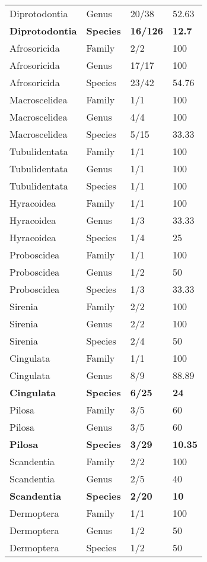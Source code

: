 \begin{longtable}{llll}
  Diprotodontia & Genus & 20/38 & 52.63 \\ 
  \textbf{Diprotodontia} & \textbf{Species} & \textbf{16/126} & \textbf{12.7} \\ 
  Afrosoricida & Family & 2/2 & 100 \\ 
  Afrosoricida & Genus & 17/17 & 100 \\ 
  Afrosoricida & Species & 23/42 & 54.76 \\ 
  Macroscelidea & Family & 1/1 & 100 \\ 
  Macroscelidea & Genus & 4/4 & 100 \\ 
  Macroscelidea & Species & 5/15 & 33.33 \\ 
  Tubulidentata & Family & 1/1 & 100 \\ 
  Tubulidentata & Genus & 1/1 & 100 \\ 
  Tubulidentata & Species & 1/1 & 100 \\ 
  Hyracoidea & Family & 1/1 & 100 \\ 
  Hyracoidea & Genus & 1/3 & 33.33 \\ 
  Hyracoidea & Species & 1/4 & 25 \\ 
  Proboscidea & Family & 1/1 & 100 \\ 
  Proboscidea & Genus & 1/2 & 50 \\ 
  Proboscidea & Species & 1/3 & 33.33 \\ 
  Sirenia & Family & 2/2 & 100 \\ 
  Sirenia & Genus & 2/2 & 100 \\ 
  Sirenia & Species & 2/4 & 50 \\ 
  Cingulata & Family & 1/1 & 100 \\ 
  Cingulata & Genus & 8/9 & 88.89 \\ 
  \textbf{Cingulata} & \textbf{Species} & \textbf{6/25} & \textbf{24} \\ 
  Pilosa & Family & 3/5 & 60 \\ 
  Pilosa & Genus & 3/5 & 60 \\ 
  \textbf{Pilosa} & \textbf{Species} & \textbf{3/29} & \textbf{10.35} \\ 
  Scandentia & Family & 2/2 & 100 \\ 
  Scandentia & Genus & 2/5 & 40 \\ 
  \textbf{Scandentia} & \textbf{Species} & \textbf{2/20} & \textbf{10} \\ 
  Dermoptera & Family & 1/1 & 100 \\ 
  Dermoptera & Genus & 1/2 & 50 \\ 
  Dermoptera & Species & 1/2 & 50 \\ 

\end{longtable}
